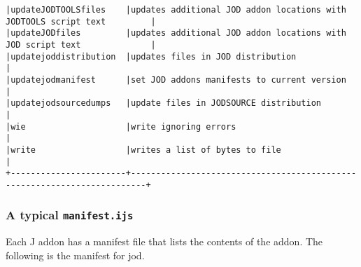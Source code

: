 \documentclass[11pt,letter,landscape]{article}
\begin{document}
\begin{Verbatim}[commandchars=\\\{\}]
|updateJODTOOLSfiles    |updates additional JOD addon locations with JODTOOLS script text         |
|updateJODfiles         |updates additional JOD addon locations with JOD script text              |
|updatejoddistribution  |updates files in JOD distribution                                        |
|updatejodmanifest      |set JOD addons manifests to current version                              |
|updatejodsourcedumps   |update files in JODSOURCE distribution                                   |
|wie                    |write ignoring errors                                                    |
|write                  |writes a list of bytes to file                                           |
+-----------------------+-------------------------------------------------------------------------+

    \end{Verbatim}

    \subsubsection{\texorpdfstring{A typical
\texttt{manifest.ijs}}{A typical manifest.ijs}}\label{a-typical-manifest.ijs}

Each J addon has a manifest file that lists the contents of the addon.
The following is the manifest for jod.
\end{document}

